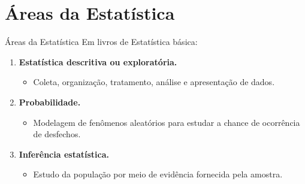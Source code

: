 \documentclass[
  ignorenonframetext,
  serif,
  professionalfont,
  usenames,
  dvipsnames,
  aspectratio = 169]{beamer}
\providecommand{\tightlist}{%
  \setlength{\itemsep}{0pt}\setlength{\parskip}{0pt}}
\renewcommand{\tightlist}{%
  \setlength{\itemsep}{0\baselineskip}
  \setlength{\parskip}{0.25\baselineskip}
}
\def\endColumns{\end{minipage}}%
\begin{document}

\section{Áreas da Estatística}\label{uxe1reas-da-estatuxedstica}

\begin{frame}{Áreas da Estatística}
\label{uxe1reas-da-estatuxedstica-1}
Em livros de Estatística básica:

\begin{enumerate}
\tightlist
\item
  \textbf{Estatística descritiva ou exploratória.}

  \begin{itemize}
  \tightlist
  \item
    Coleta, organização, tratamento, análise e apresentação de dados.
  \end{itemize}
\item
  \textbf{Probabilidade.}

  \begin{itemize}
  \tightlist
  \item
    Modelagem de fenômenos aleatórios para estudar a chance de
    ocorrência de desfechos.
  \end{itemize}
\item
  \textbf{Inferência estatística.}

  \begin{itemize}
  \tightlist
  \item
    Estudo da população por meio de evidência fornecida pela amostra.
  \end{itemize}
\end{enumerate}
\end{frame}
\end{document}
